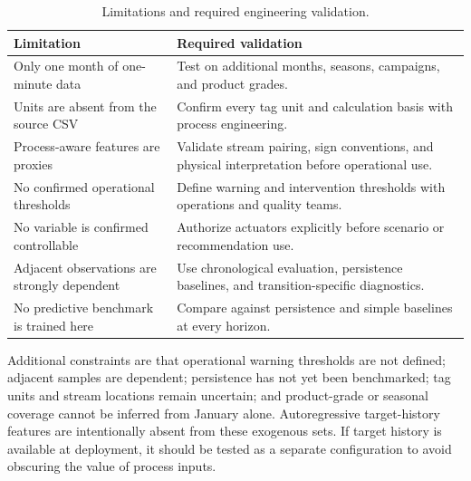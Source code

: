 \documentclass[10pt,a4paper]{article}
\begin{document}
\begin{table}[H]
\centering
\footnotesize
\begin{tabular}{p{}p{}}
\toprule
Limitation & Required validation \\
\midrule
Only one month of one-minute data & Test on additional months, seasons, campaigns, and product grades. \\
Units are absent from the source CSV & Confirm every tag unit and calculation basis with process engineering. \\
Process-aware features are proxies & Validate stream pairing, sign conventions, and physical interpretation before operational use. \\
No confirmed operational thresholds & Define warning and intervention thresholds with operations and quality teams. \\
No variable is confirmed controllable & Authorize actuators explicitly before scenario or recommendation use. \\
Adjacent observations are strongly dependent & Use chronological evaluation, persistence baselines, and transition-specific diagnostics. \\
No predictive benchmark is trained here & Compare against persistence and simple baselines at every horizon. \\
\bottomrule
\end{tabular}
\caption{Limitations and required engineering validation.}
\end{table}


Additional constraints are that operational warning thresholds are not defined; adjacent samples are dependent; persistence has not yet been benchmarked; tag units and stream locations remain uncertain; and product-grade or seasonal coverage cannot be inferred from January alone. Autoregressive target-history features are intentionally absent from these exogenous sets. If target history is available at deployment, it should be tested as a separate configuration to avoid obscuring the value of process inputs.
\end{document}
